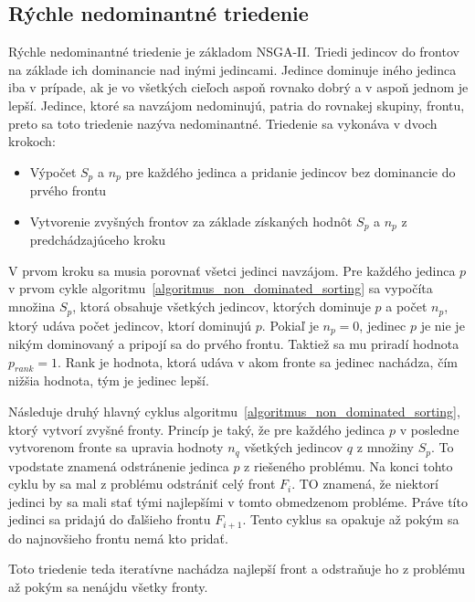 \subsection*{Rýchle nedominantné triedenie}
Rýchle nedominantné triedenie je základom NSGA-II.
Triedi jedincov do frontov na základe ich dominancie nad inými jedincami.
Jedince dominuje iného jedinca iba v prípade, ak je vo všetkých cieľoch aspoň rovnako dobrý a v aspoň jednom je lepší.
Jedince, ktoré sa navzájom nedominujú, patria do rovnakej skupiny, frontu, preto sa toto triedenie nazýva nedominantné.
Triedenie sa vykonáva v dvoch krokoch:
\begin{itemize}
  \item Výpočet $S_p$ a $n_p$ pre každého jedinca a pridanie jedincov bez dominancie do prvého frontu
  \item Vytvorenie zvyšných frontov za základe získaných hodnôt $S_p$ a $n_p$ z predchádzajúceho kroku
\end{itemize}
V prvom kroku sa musia porovnať všetci jedinci navzájom.
Pre každého jedinca $p$ v prvom cykle algoritmu~\ref{algoritmus_non_dominated_sorting} sa vypočíta množina $S_p$, ktorá obsahuje všetkých jedincov, ktorých dominuje $p$ a počet $n_p$, ktorý udáva počet jedincov, ktorí dominujú $p$.
Pokiaľ je $n_p = 0$, jedinec $p$ je nie je nikým dominovaný a pripojí sa do prvého frontu.
Taktiež sa mu priradí hodnota $p_{rank} = 1$.
Rank je hodnota, ktorá udáva v akom fronte sa jedinec nachádza, čím nižšia hodnota, tým je jedinec lepší.

Následuje druhý hlavný cyklus algoritmu~\ref{algoritmus_non_dominated_sorting}, ktorý vytvorí zvyšné fronty.
Princíp je taký, že pre každého jedinca $p$ v posledne vytvorenom fronte sa upravia hodnoty $n_q$ všetkých jedincov $q$ z množiny $S_p$.
To vpodstate znamená odstránenie jedinca $p$ z riešeného problému.
Na konci tohto cyklu by sa mal z problému odstrániť celý front $F_i$.
TO znamená, že niektorí jedinci by sa mali stať tými najlepšími v tomto obmedzenom probléme.
Práve títo jedinci sa pridajú do ďalšieho frontu $F_{i+1}$.
Tento cyklus sa opakuje až pokým sa do najnovšieho frontu nemá kto pridať.

Toto triedenie teda iteratívne nachádza najlepší front a odstraňuje ho z problému až pokým sa nenájdu všetky fronty.

